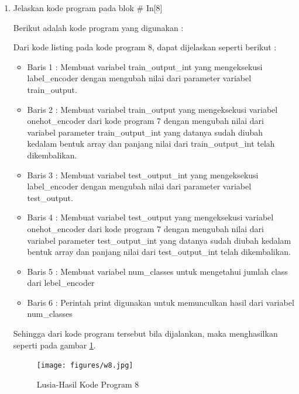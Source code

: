 \begin{enumerate}
\item Jelaskan kode program pada blok \# In[8]
	\par Berikut adalah kode program yang digunakan :
	
	\par Dari kode listing pada kode program 8, dapat dijelaskan seperti berikut :
	\begin{itemize}
	\item Baris 1	: Membuat variabel train\_output\_int yang mengeksekusi label\_encoder dengan mengubah nilai dari parameter variabel train\_output.
	\item Baris 2	: Membuat variabel train\_output yang mengeksekusi variabel onehot\_encoder dari kode program 7 dengan mengubah nilai dari variabel parameter train\_output\_int yang datanya sudah diubah kedalam bentuk array dan panjang nilai dari train\_output\_int telah dikembalikan.
	\item Baris 3	: Membuat variabel test\_output\_int yang mengeksekusi label\_encoder dengan mengubah nilai dari parameter variabel test\_output.
	\item Baris 4	: Membuat variabel test\_output yang mengeksekusi variabel onehot\_encoder dari kode program 7 dengan mengubah nilai dari variabel parameter test\_output\_int yang datanya sudah diubah kedalam bentuk array dan panjang nilai dari test\_output\_int telah dikembalikan.
	\item Baris 5	: Membuat variabel num\_classes untuk mengetahui jumlah class dari lebel\_encoder
	\item Baris 6	: Perintah print digunakan untuk memunculkan hasil dari variabel num\_classes
	\end{itemize}
	\par Sehingga dari kode program tersebut bila dijalankan, maka menghasilkan seperti pada gambar \ref{7B8}.
		\begin{figure}[!hbtp]
		\centering
		\texttt{[image: figures/w8.jpg]}
		\caption{Lusia-Hasil Kode Program 8}
		\label{7B8}
		\end{figure}
		

\end{enumerate}
